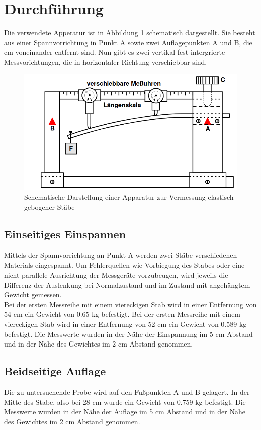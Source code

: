 \section{Durchführung}
\label{sec:Durchführung}

Die verwendete Apperatur ist in Abbildung \ref{fig:backfisch} schematisch dargestellt. Sie besteht aus 
einer Spannvorrichtung in Punkt A sowie zwei Auflagepunkten A und B, die %
cm voneinander entfernt sind.
Nun gibt es zwei vertikal fest intergrierte Messvorichtungen, die in horizontaler Richtung 
verschiebbar sind.
\begin{figure}
    \centering
    \includegraphics[scale=0.5]{panierte Austern.png}
    \caption{Schematische Darstellung einer Apparatur zur Vermessung elastisch gebogener Stäbe}
    \label{fig:backfisch}
\end{figure}

\subsection{Einseitiges Einspannen}
    Mittels der Spannvorrichtung an Punkt A werden zwei Stäbe verschiedenen Materials
    eingespannt. Um Fehlerquellen wie Vorbiegung des Stabes oder eine nicht parallele
    Ausrichtung der Messgeräte vorzubeugen, wird jeweils die Differenz der Auslenkung
    bei Normalzustand und im Zustand mit angehängtem Gewicht gemessen.\\
    Bei der ersten Messreihe mit einem viereckigen Stab wird in einer Entfernung von 54
    cm ein Gewicht von 0.65 kg befestigt.
    Bei der ersten Messreihe mit einem viereckigen Stab wird in einer Entfernung von 52
    cm ein Gewicht von 0.589 kg befestigt.
    Die Messwerte wurden in der Nähe der Einspannung im 5 cm Abstand und in der Nähe
    des Gewichtes im 2 cm Abstand genommen.


\subsection{Beidseitige Auflage}
    Die zu untersuchende Probe wird auf den Fußpunkten A und B gelagert. In der Mitte
    des Stabe, also bei 28 cm wurde ein Gewicht von 0.759 kg befestigt.
    Die Messwerte wurden in der Nähe der Auflage im 5 cm Abstand und in der Nähe
    des Gewichtes im 2 cm Abstand genommen.